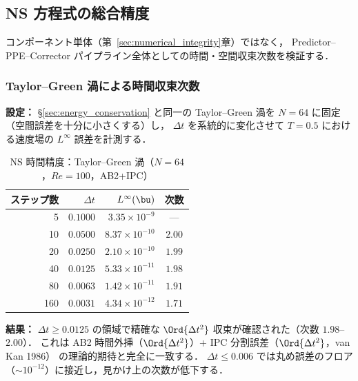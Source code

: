%
\subsection{NS 方程式の総合精度}
\label{sec:ns_time_accuracy}

コンポーネント単体（第~\ref{sec:numerical_integrity}章）ではなく，
Predictor--PPE--Corrector パイプライン全体としての時間・空間収束次数を検証する．

\subsubsection{Taylor--Green 渦による時間収束次数}
\label{sec:tgv_temporal}

\textbf{設定：}
§\ref{sec:energy_conservation} と同一の Taylor--Green 渦を
$N = 64$ に固定（空間誤差を十分に小さくする）し，
$\Delta t$ を系統的に変化させて $T = 0.5$ における速度場の $L^\infty$ 誤差を計測する．

\begin{table}[htbp]
\centering
\caption{NS 時間精度：Taylor--Green 渦（$N=64$，$\mathit{Re}=100$，AB2+IPC）}
\label{tab:tgv_temporal}
\begin{tabular}{rrrc}
\toprule
ステップ数 & $\Delta t$ & $L^\infty(\bu)$ & 次数 \\
\midrule
  5  & $0.1000$ & $3.35 \times 10^{-9}$  & --- \\
 10  & $0.0500$ & $8.37 \times 10^{-10}$ & $2.00$ \\
 20  & $0.0250$ & $2.10 \times 10^{-10}$ & $1.99$ \\
 40  & $0.0125$ & $5.33 \times 10^{-11}$ & $1.98$ \\
 80  & $0.0063$ & $1.42 \times 10^{-11}$ & $1.91$ \\
160  & $0.0031$ & $4.34 \times 10^{-12}$ & $1.71$ \\
\bottomrule
\end{tabular}
\end{table}

\textbf{結果：}
$\Delta t \geq 0.0125$ の領域で精確な $\Ord{\Delta t^2}$ 収束が確認された（次数 $1.98$--$2.00$）．
これは AB2 時間外挿（$\Ord{\Delta t^2}$）+ IPC 分割誤差（$\Ord{\Delta t^2}$，van Kan 1986）
の理論的期待と完全に一致する．
$\Delta t \leq 0.006$ では丸め誤差のフロア（$\sim 10^{-12}$）に接近し，見かけ上の次数が低下する．

